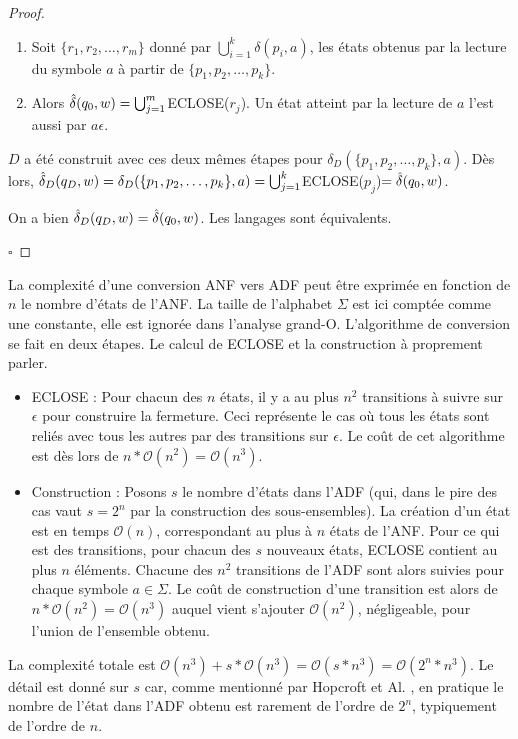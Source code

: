 \begin{proof}
	\begin{enumerate}
		\item Soit $\{r_1,r_2,\dots, r_m\}$ donné par $\bigcup_{i=1}^k \delta(p_i,a)$, les états obtenus par la lecture du symbole $a$ à partir de $\{p_1,p_2,\dots,p_k\}$.
		\item Alors $\hat{\delta}(q_0,w)=\bigcup_{j=1}^m$ECLOSE($r_j$). Un état atteint par la lecture de $a$ l'est aussi par $a\epsilon$.
	\end{enumerate}
	
	$D$ a été construit avec ces deux mêmes étapes pour $\delta_D(\{p_1,p_2,\dots, p_k\},a)$. Dès lors, $\hat{\delta}_D(q_D,w)=\delta_D(\{p_1,p_2,\dots, p_k\},a)=\bigcup_{j=1}^k$ECLOSE($p_j$)$=\hat{\delta}(q_0,w)$. 
	
	On a bien $\hat{\delta}_D(q_D,w)=\hat{\delta}(q_0,w)$. Les langages sont équivalents.
	
	\hfill$\square$
\end{proof}


\begin{complexity}
	
	La complexité d'une conversion ANF vers ADF peut être exprimée en fonction de $n$ le nombre d'états de l'ANF. La taille de l'alphabet $\Sigma$ est ici comptée comme une constante, elle est ignorée dans l'analyse grand-O. L'algorithme de conversion se fait en deux étapes. Le calcul de ECLOSE et la construction à proprement parler.
	
	\begin{itemize}
		\item ECLOSE : Pour chacun des $n$ états, il y a au plus $n^2$ transitions à suivre sur $\epsilon$ pour construire la fermeture. Ceci représente le cas où tous les états sont reliés avec tous les autres par des transitions sur $\epsilon$. Le coût de cet algorithme est dès lors de $n*\mathcal{O}(n^2)=\mathcal{O}(n^3)$.
		
		\item Construction : Posons $s$ le nombre d'états dans l'ADF (qui, dans le pire des cas vaut $s=2^n$ par la construction des sous-ensembles). La création d'un état est en temps $\mathcal{O}(n)$, correspondant au plus à $n$ états de l'ANF. Pour ce qui est des transitions, pour chacun des $s$ nouveaux états, ECLOSE contient au plus $n$ éléments. Chacune des $n^2$ transitions de l'ADF sont alors suivies pour chaque symbole $a\in\Sigma$. Le coût de construction d'une transition est alors de $n*\mathcal{O}(n^2)=\mathcal{O}(n^3)$ auquel vient s'ajouter $\mathcal{O}(n^2)$, négligeable, pour l'union de l'ensemble obtenu.
	\end{itemize}
	
	La complexité totale est $\mathcal{O}(n^3) + s * \mathcal{O}(n^3) = \mathcal{O}(s*n^3) = \mathcal{O}(2^n*n^3)$.
	Le détail est donné sur $s$ car, comme mentionné par Hopcroft et Al. \cite{Hopcroft00}, en pratique le nombre de l'état dans l'ADF obtenu est rarement de l'ordre de $2^n$, typiquement de l'ordre de $n$.
	
\end{complexity}



